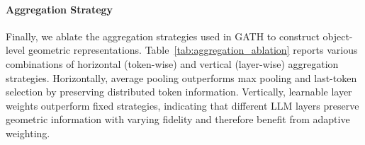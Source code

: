 \documentclass[lettersize,journal]{IEEEtran}
\begin{document}

\paragraph*{Aggregation Strategy} Finally, we ablate the aggregation strategies used in GATH to construct object-level geometric representations. {Table~\ref{tab:aggregation_ablation} reports various combinations of horizontal (token-wise) and vertical (layer-wise) aggregation strategies. Horizontally, average pooling outperforms max pooling and last-token selection by preserving distributed token information. Vertically, learnable layer weights outperform fixed strategies, indicating that different LLM layers preserve geometric information with varying fidelity and therefore benefit from adaptive weighting.}

\end{document}
